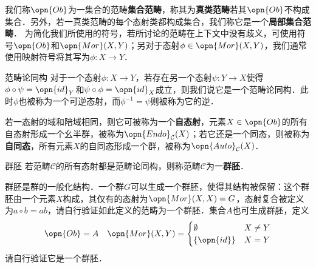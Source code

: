 我们称$\opn{Ob}$为一集合的范畴\textbf{集合范畴}，称其为\textbf{真类范畴}若其$\opn{Ob}$不构成集合．另外，若一真类范畴的每个态射类都构成集合，我们称它是一个\textbf{局部集合范畴}．
为简化我们所使用的符号，若所讨论的范畴在上下文中没有歧义，可使用符号$\opn{Ob}$和$\opn{Mor}(X,Y)$；另对于态射$\phi\in\opn{Mor}(X,Y)$，我们通常使用映射符号将其写为$\phi:X\to Y$．

\begin{definition}{范畴论同构}
对于一个态射$\phi:X\to Y$，若存在另一个态射$\psi:Y\to X$使得$\phi\circ\psi=\opn{id}_Y$和$\psi\circ\phi=\opn{id}_X$成立，则我们说它是一个范畴论同构．此时$\phi$也被称为一个可逆态射，而$\phi^{-1}=\psi$则被称为它的逆．
\end{definition}
若一态射的域和陪域相同，则它可被称为一个\textbf{自态射}，元素$X\in\opn{Ob}$的所有自态射形成一个幺半群，被称为$\opn{Endo}_\mathcal{C}(X)$；若它还是一个同态，则被称为\textbf{自同态}，所有元素$X$的自同态形成一个群，被称为$\opn{Auto}_\mathcal{C}(X)$．

\begin{definition}{群胚}
若范畴$\mathcal{C}$的所有态射都是范畴论同构，则称范畴$\mathcal{C}$为一\textbf{群胚}．
\end{definition}
群胚是群的一般化结构．一个群$G$可以生成一个群胚，使得其结构被保留：这个群胚由一个元素$X$构成，其仅有的态射为$\opn{Mor}(X,X)=G$，态射复合被定义为$a\circ b=ab$，请自行验证如此定义的范畴为一个群胚．集合$A$也可生成群胚，定义$$\opn{Ob}=A\quad\opn{Mor}(X,Y)=\begin{cases}\emptyset&X\neq Y\\\{\opn{id}\}&X=Y\end{cases}$$请自行验证它是一个群胚．

